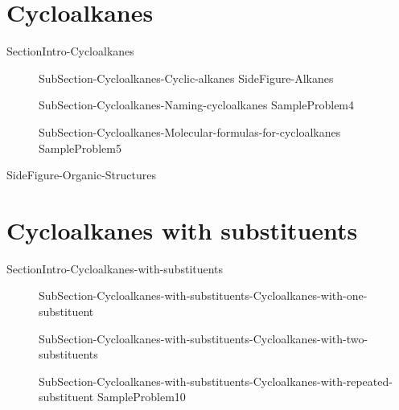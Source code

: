 \documentclass[main.tex]{subfiles}
\begin{document}
\section{Cycloalkanes}{SectionIntro-Cycloalkanes}
\sloppy\begin{description}
\item[] {SubSection-Cycloalkanes-Cyclic-alkanes}
{SideFigure-Alkanes}
\item[]{SubSection-Cycloalkanes-Naming-cycloalkanes}
{SampleProblem4}
\item[]{SubSection-Cycloalkanes-Molecular-formulas-for-cycloalkanes}
{SampleProblem5}
\end{description}

{SideFigure-Organic-Structures}
\section{Cycloalkanes with substituents}{SectionIntro-Cycloalkanes-with-substituents}
\sloppy
\begin{description}
\item[]{SubSection-Cycloalkanes-with-substituents-Cycloalkanes-with-one-substituent}
\item[] {SubSection-Cycloalkanes-with-substituents-Cycloalkanes-with-two-substituents}
\item[]{SubSection-Cycloalkanes-with-substituents-Cycloalkanes-with-repeated-substituent}
{SampleProblem10}
\end{description}
\end{document}
